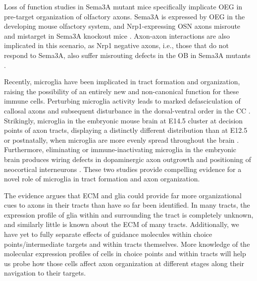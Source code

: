 Loss of function studies in Sema3A mutant mice specifically implicate OEG in pre-target organization of olfactory axons.
Sema3A is expressed by OEG in the developing mouse olfactory system, and Nrp1-expressing OSN axons misroute and mistarget in Sema3A knockout mice \cite{schwarting2000semaphorin}.
Axon-axon interactions are also implicated in this scenario, as Nrp1 negative axons, i.e., those that do not respond to Sema3A, also suffer misrouting defects in the OB in Sema3A mutants \cite{schwarting2000semaphorin}.

Recently, microglia have been implicated in tract formation and organization, raising the possibility of an entirely new and non-canonical function for these immune cells.
Perturbing microglia activity leads to marked defasciculation of callosal axons and subsequent disturbance in the dorsal-ventral order in the CC \cite{pont2014microglia}.
Strikingly, microglia in the embryonic mouse brain at E14.5 cluster at decision points of axon tracts, displaying a distinctly different distribution than at E12.5 or postnatally, when microglia are more evenly spread throughout the brain \cite{squarzoni2014microglia}.
Furthermore, eliminating or immune-inactivating microglia in the embryonic brain produces wiring defects in dopaminergic axon outgrowth and positioning of neocortical interneurons \cite{squarzoni2014microglia}.
These two studies provide compelling evidence for a novel role of microglia in tract formation and axon organization.

The evidence argues that ECM and glia could provide far more organizational cues to axons in their tracts than have so far been identified.
In many tracts, the expression profile of glia within and surrounding the tract is completely unknown, and similarly little is known about the ECM of many tracts.
Additionally, we have yet to fully separate effects of guidance molecules within choice points/intermediate targets and within tracts themselves.
More knowledge of the molecular expression profiles of cells in choice points and within tracts will help us probe how those cells affect axon organization at different stages along their navigation to their targets.